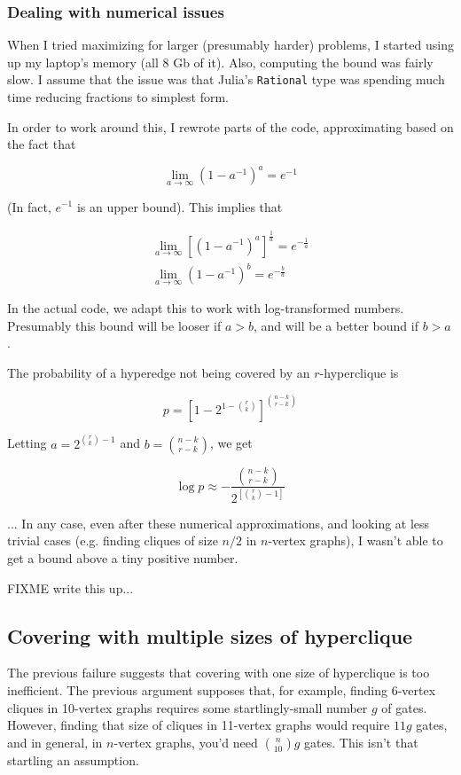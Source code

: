 \documentclass[12pt]{article}
\theoremstyle{definition}
\begin{document}
\subsubsection{Dealing with numerical issues}

When I tried maximizing for larger (presumably harder)
problems, I started using up my laptop's
memory (all 8 Gb of it). Also, computing the bound
was fairly slow. I assume that the
issue was that Julia's {\tt Rational} type was spending much time reducing
fractions to simplest form.

In order to work around this, I rewrote parts of the code,
approximating based on the fact that

\[
\lim_{a\to\infty} (1 - a^{-1})^{a} = e^{-1}
\]

(In fact, $e^{-1}$ is an upper bound). This implies that

\begin{eqnarray*}
\lim_{a\to\infty} [(1 - a^{-1})^{a}]^\frac{1}{a} = e^{-\frac{1}{a}} \\
\lim_{a\to\infty} (1 - a^{-1})^{b} = e^{-\frac{b}{a}}
\end{eqnarray*}

In the actual code, we adapt this to work with log-transformed numbers. Presumably this bound will be looser if $a > b$, and
will be a better bound if $b > a$.

The probability of a hyperedge not being covered by an $r$-hyperclique is

\[
p = [1 - 2 ^ {1-{r \choose k}}] ^ {n-k \choose r-k}
\]

Letting $a = 2^{{r \choose k}-1}$ and $b = {n-k \choose r-k}$, we get

\[
\log p \approx - \frac{{n-k \choose r-k}} {2^{[{r \choose k}-1]}}
\]


... In any case, even after these numerical approximations, and
looking at less trivial cases (e.g. finding cliques of size $n/2$ in
$n$-vertex graphs), I wasn't able to get a bound above a tiny
positive number.

FIXME write this up...

\subsection{Covering with multiple sizes of hyperclique}

The previous failure suggests that covering
with one size of hyperclique is too inefficient. The previous
argument supposes that, for example, finding 6-vertex cliques
in 10-vertex graphs requires some startlingly-small number $g$ of
gates. However, finding that size of cliques in 11-vertex graphs
would require $11g$ gates, and in general, in $n$-vertex graphs,
you'd need ${n \choose 10}g$ gates.
This isn't that startling an assumption.
\end{document}
